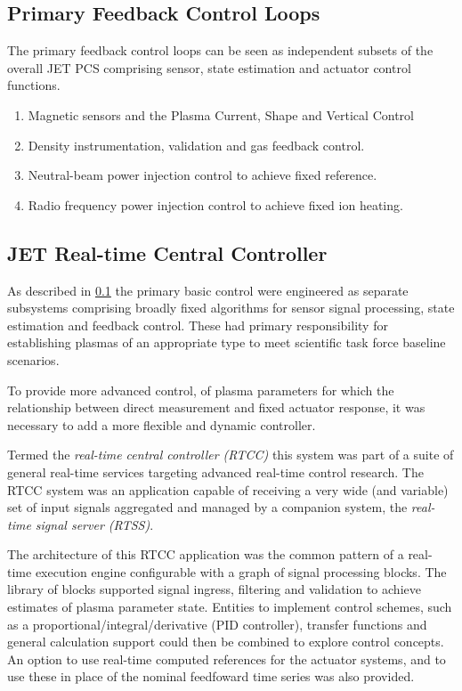 \documentclass[preprint,12pt]{elsarticle}
\begin{document}
\subsection{Primary Feedback Control Loops}

\label{s_primary_fb}

The primary feedback control loops can be seen as independent subsets of the overall JET PCS
comprising sensor, state estimation and actuator control functions.

\begin{enumerate}
	\item{Magnetic sensors and the Plasma Current, Shape and Vertical Control}
	\item{Density instrumentation, validation and gas feedback control.}
	\item{Neutral-beam power injection control to achieve fixed reference.}
	\item{Radio frequency power injection control to achieve fixed ion heating.}
\end{enumerate}

\subsection{JET Real-time Central Controller}
\label{s_rtcc}

As described in \ref{s_primary_fb} the primary basic control were
engineered as separate subsystems comprising broadly fixed algorithms
for sensor signal processing, state estimation and feedback control.
These had primary responsibility for establishing plasmas of an
appropriate type to meet scientific task force baseline scenarios.

To provide more advanced control, of plasma parameters for which the
relationship between direct measurement and fixed actuator response, 
it was necessary to add a more flexible and dynamic controller.

Termed the {\em real-time central controller (RTCC)} this system was
part of a suite of general real-time services targeting advanced
real-time control research.  The RTCC system was an application 
capable of receiving a very wide (and variable) set of input signals
aggregated and managed by a companion system, the {\em real-time signal server (RTSS)}.

The architecture of this RTCC application was the common pattern of
a real-time execution engine configurable with a graph of signal
processing blocks.  The library of blocks supported signal ingress,
filtering and validation to achieve estimates of plasma parameter
state.  Entities to implement control schemes, such as a proportional/integral/derivative
(PID controller), transfer functions and general calculation support
could then be combined to explore control concepts.  An option to
use real-time computed references for the actuator systems, and to 
use these in place of the nominal feedfoward time series was also
provided.
\end{document}
